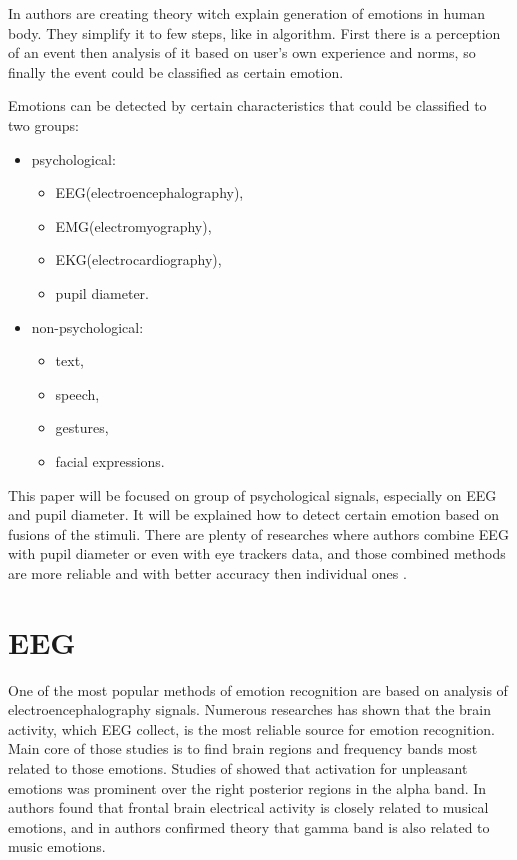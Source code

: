 \documentclass[10pt,journal,compsoc,twoside]{IEEEtran}
\begin{document}
In \cite{OrtonyCloreCollins1988} authors are creating theory witch explain generation of emotions in human body. They simplify it to few steps, like in algorithm. First there is a perception of an event then analysis of it based on user's own experience and norms, so finally the event could be classified as certain emotion.

Emotions can be detected by certain characteristics that could be classified to two groups:
\begin{itemize}
	\item psychological:
	\begin{itemize}
		\item EEG(electroencephalography),
		\item EMG(electromyography), 
		\item EKG(electrocardiography), 
		\item pupil diameter.
	\end{itemize} 
	\item non-psychological: 
	\begin{itemize} 
		\item text, 
		\item speech,
		\item  gestures, 
		\item facial expressions.
	\end{itemize}
\end{itemize}
This paper will be focused on group of psychological signals, especially on EEG and pupil diameter. It will be explained how to detect certain emotion based on fusions of the stimuli. There are plenty of researches where authors combine EEG with pupil diameter or even with eye trackers data, and those combined methods are more reliable and with better accuracy then individual ones \cite{WeiLongBoNanBaoLiang2014,CalvoDMello2010,SoleymaniPanticPun2002}. 
\section{EEG}
One of the most popular methods of emotion recognition are based on analysis of electroencephalography signals. Numerous researches\cite{LinMusic,GaoMehmood,NieWangShiLu} has shown that the brain activity, which EEG collect, is the most reliable source for emotion recognition. Main core of those studies is to find brain regions and frequency bands most related to those emotions. Studies of \cite{SarloBuodoPoliPalomba} showed that activation for unpleasant emotions was prominent over the right posterior regions in the alpha band. In \cite{SchmidtTrainor2001} authors found that frontal brain electrical activity is closely related to musical emotions, and in \cite{LiLu2009} authors confirmed theory that gamma band is also related to music emotions.
\end{document}
